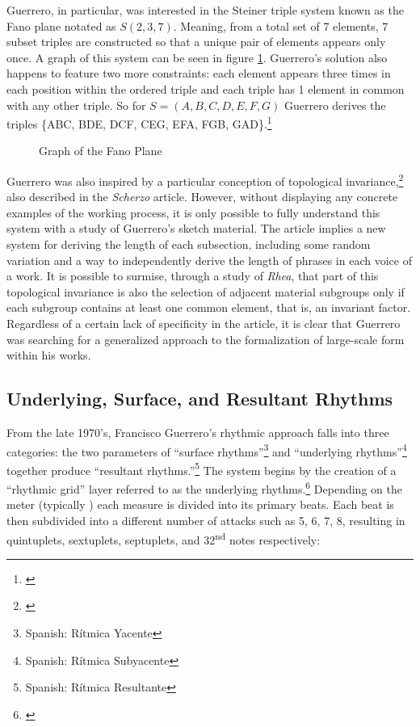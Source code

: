 Guerrero, in particular, was interested in the Steiner triple system known as the Fano plane notated as $S(2,3,7)$. Meaning, from a total set of 7 elements, 7 subset triples are constructed so that a unique pair of elements appears only once. A graph of this system can be seen in figure \ref{fig:fano-plane}. Guerrero's solution also happens to feature two more constraints: each element appears three times in each position within the ordered triple and each triple has 1 element in common with any other triple. So for $S=(A, B, C, D, E, F, G)$ Guerrero derives the triples \{ABC, BDE, DCF, CEG, EFA, FGB, GAD\}.\footnote{\citet{guerrerotopology}} 

\begin{figure}[H]
    \centering
    \FanoPlane[3cm]
    \caption{Graph of the Fano Plane}
    \label{fig:fano-plane}
\end{figure}

Guerrero was also inspired by a particular conception of topological invariance,\footnote{\citet[85]{besada}} also described in the \textit{Scherzo} article. However, without displaying any concrete examples of the working process, it is only possible to fully understand this system with a study of Guerrero's sketch material. The article implies a new system for deriving the length of each subsection, including some random variation and a way to independently derive the length of phrases in each voice of a work. It is possible to surmise, through a study of \textit{Rhea}, that part of this topological invariance is also the selection of adjacent material subgroups only if each subgroup contains at least one common element, that is, an invariant factor. Regardless of a certain lack of specificity in the article, it is clear that Guerrero was searching for a generalized approach to the formalization of large-scale form within his works.

\subsection{Underlying, Surface, and Resultant Rhythms}

From the late 1970's, Francisco Guerrero's rhythmic approach falls into three categories: the two parameters of ``surface rhythms''\footnote{Spanish: Rítmica Yacente} and ``underlying rhythms''\footnote{Spanish: Rítmica Subyacente} together produce ``resultant rhythms.''\footnote{Spanish: Rítmica Resultante} The system begins by the creation of a ``rhythmic grid'' layer referred to as the underlying rhythms.\footnote{{\citet[153]{guerreropaper}}} Depending on the meter (typically ) each measure is divided into its primary beats. Each beat is then subdivided into a different number of attacks such as 5, 6, 7, 8, resulting in quintuplets, sextuplets, septuplets, and 32\textsuperscript{nd} notes respectively:

